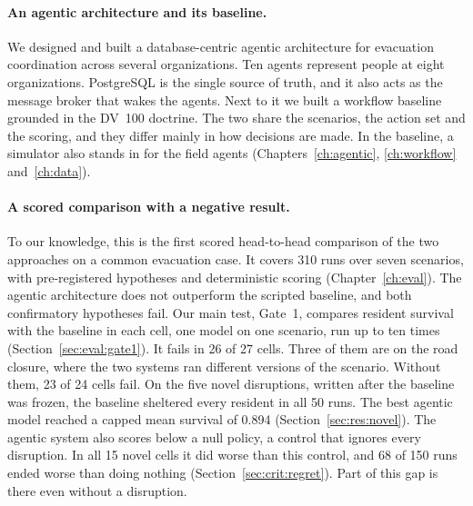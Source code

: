 \paragraph{An agentic architecture and its baseline.} We designed and built a
database-centric agentic architecture for evacuation coordination across
several organizations. Ten agents represent people at eight organizations.
PostgreSQL is the single source of truth, and it also acts as the message
broker that wakes the agents. Next to it we built a workflow baseline grounded
in the DV~100 doctrine. The two share the scenarios, the action set and the
scoring, and they differ mainly in how decisions are made. In the baseline, a
simulator also stands in for the field agents
(Chapters~\ref{ch:agentic}, \ref{ch:workflow} and~\ref{ch:data}).

\paragraph{A scored comparison with a negative result.} To our knowledge, this
is the first scored head-to-head comparison of the two approaches on a common
evacuation case. It covers 310 runs over seven scenarios, with pre-registered
hypotheses and deterministic scoring (Chapter~\ref{ch:eval}). The agentic
architecture does not outperform the scripted baseline, and both confirmatory
hypotheses fail. Our main test, Gate~1, compares resident survival with the
baseline in each cell, one model on one scenario, run up to ten times
(Section~\ref{sec:eval:gate1}). It fails in 26 of 27 cells. Three of them are
on the road closure, where the two systems ran different versions of the
scenario. Without them, 23 of 24 cells fail. On the five novel disruptions,
written after the baseline was frozen, the baseline sheltered every resident
in all 50 runs. The best agentic model reached a capped mean survival of 0.894
(Section~\ref{sec:res:novel}). The agentic system also scores below a null
policy, a control that ignores every disruption. In all 15 novel cells it did
worse than this control, and 68 of 150 runs ended worse than doing nothing
(Section~\ref{sec:crit:regret}). Part of this gap is there even without a
disruption.

